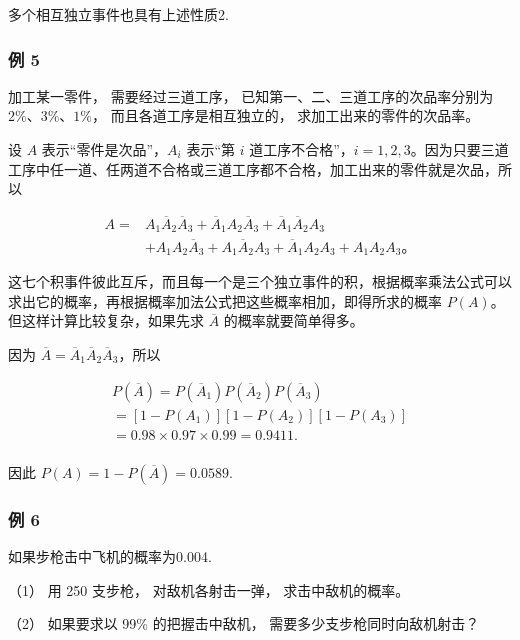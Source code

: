 多个相互独立事件也具有上述性质2.

\subsubsection{例 5}

加工某一零件， 需要经过三道工序， 已知第一、二、三道工序的次品率分别为
\(2\%\)、\(3\%\)、\(1\%\)， 而且各道工序是相互独立的，
求加工出来的零件的次品率。


设 \(A\) 表示``零件是次品''，\(A_{i}\) 表示``第 \(i\)
道工序不合格''，\(i = 1, 2, 3\)。因为只要三道工序中任一道、任两道不合格或三道工序都不合格，加工出来的零件就是次品，所以

\[
\begin{aligned}
A={}&A_1\overline A_2\overline A_3+\overline A_1A_2\overline A_3+\overline A_1\overline A_2A_3\\
&+A_1A_2\overline A_3+A_1\overline A_2A_3+\overline A_1A_2A_3+A_1A_2A_3\text{。}
\end{aligned}
\]

这七个积事件彼此互斥，而且每一个是三个独立事件的积，根据概率乘法公式可以求出它的概率，再根据概率加法公式把这些概率相加，即得所求的概率
\(P(A)\)。但这样计算比较复杂，如果先求 \(\overline{A}\)
的概率就要简单得多。

 因为
\(\overline A=\overline A_1\overline A_2\overline A_3\)，所以

\[
\begin{array}{l} P (\overline {{{A}}}) = P (\overline {{{A}}} _ {1}) P (\overline {{{A}}} _ {2}) P (\overline {{{A}}} _ {3}) \\ = [ 1 - P (A _ {1}) ] [ 1 - P (A _ {2}) ] [ 1 - P (A _ {3}) ] \\ = 0.98 \times 0.97 \times 0.99 = 0.9411. \\ \end{array}
\]

因此 \(P(A) = 1 - P(\overline{A}) = 0.0589.\)

\subsubsection{例 6}

如果步枪击中飞机的概率为0.004.

（1） 用 250 支步枪， 对敌机各射击一弹， 求击中敌机的概率。

（2） 如果要求以 99\% 的把握击中敌机， 需要多少支步枪同时向敌机射击？

